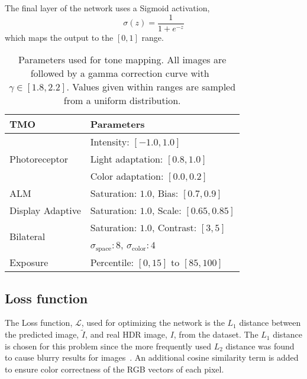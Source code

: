 \documentclass{egpubl}
\newcommand\la[1]{\multicolumn{1}{l}{#1}}
\begin{document}
The final layer of the network uses a Sigmoid activation,
\begin{equation}
    \sigma(z) = \frac{1}{1 + e^{-z}}
\end{equation}
which maps the output to the $[0, 1]$ range.

\begin{table}[!t]
    \caption{Parameters used for tone mapping. All images are followed by a gamma
    correction curve with\ $\gamma \in [1.8,2.2]$. Values given within ranges are
    sampled from a uniform distribution.}\label{table:tmo_param}
    \centering
    \begin{tabular}{ll}
    \toprule
    \bfseries TMO & \bfseries Parameters\\\midrule
    \la{\multirow{3}{*}{Photoreceptor}} & \la{Intensity: $[-1.0,1.0]$}\\
                                   & \la{Light adaptation: $[0.8,1.0]$}\\
                                   & \la{Color adaptation: $[0.0,0.2]$}\\\midrule
    \la{\multirow{1}{*}{ALM}}    & \la{Saturation:  $1.0$, Bias: $[0.7,0.9]$}\\\midrule
    \la{\multirow{1}{*}{Display Adaptive}}  & \la{Saturation:  $1.0$, Scale: $[0.65,0.85]$}\\\midrule
    \la{\multirow{2}{*}{Bilateral}}   & \la{Saturation:  $1.0$, Contrast: $[3,5]$}\\
                                   & \la{$\sigma_{\text{space}}: 8$, $\sigma_{\text{color}}: 4$}\\\midrule
    \la{\multirow{1}{*}{Exposure}} & \la{Percentile: $[0,15]$ to $[85,100]$}\\\bottomrule
    \end{tabular}
\end{table}

\subsection{\textbf{Loss function}}

The Loss function, $\mathcal{L}$, used for optimizing the network
is the $L_1$ distance between the predicted image, $\tilde{I}$, and real HDR image,
$I$, from the dataset. The $L_1$ distance is chosen for this
problem since the more frequently used $L_2$ distance was found to cause blurry
results for images~\cite{mathieu2016mse}. An additional cosine similarity term
is added to ensure color correctness of the RGB vectors of each pixel.
\end{document}
